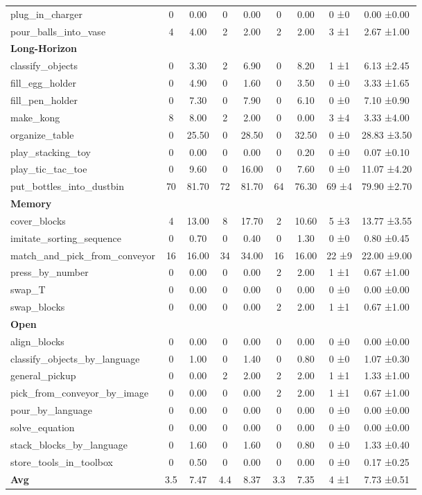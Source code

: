 \begin{table}[H]
{\begin{tabular}{l|c|c|c|c|c|c|c|c}
plug\_in\_charger & 0 & 0.00 & 0 & 0.00 & 0 & 0.00 & 0 ±0 & 0.00 ±0.00 \\
pour\_balls\_into\_vase & 4 & 4.00 & 2 & 2.00 & 2 & 2.00 & 3 ±1 & 2.67 ±1.00 \\
\hline
\multicolumn{9}{l}{\textbf{Long-Horizon}} \\
classify\_objects & 0 & 3.30 & 2 & 6.90 & 0 & 8.20 & 1 ±1 & 6.13 ±2.45 \\
fill\_egg\_holder & 0 & 4.90 & 0 & 1.60 & 0 & 3.50 & 0 ±0 & 3.33 ±1.65 \\
fill\_pen\_holder & 0 & 7.30 & 0 & 7.90 & 0 & 6.10 & 0 ±0 & 7.10 ±0.90 \\
make\_kong & 8 & 8.00 & 2 & 2.00 & 0 & 0.00 & 3 ±4 & 3.33 ±4.00 \\
organize\_table & 0 & 25.50 & 0 & 28.50 & 0 & 32.50 & 0 ±0 & 28.83 ±3.50 \\
play\_stacking\_toy & 0 & 0.00 & 0 & 0.00 & 0 & 0.20 & 0 ±0 & 0.07 ±0.10 \\
play\_tic\_tac\_toe & 0 & 9.60 & 0 & 16.00 & 0 & 7.60 & 0 ±0 & 11.07 ±4.20 \\
put\_bottles\_into\_dustbin & 70 & 81.70 & 72 & 81.70 & 64 & 76.30 & 69 ±4 & 79.90 ±2.70 \\
\hline
\multicolumn{9}{l}{\textbf{Memory}} \\
cover\_blocks & 4 & 13.00 & 8 & 17.70 & 2 & 10.60 & 5 ±3 & 13.77 ±3.55 \\
imitate\_sorting\_sequence & 0 & 0.70 & 0 & 0.40 & 0 & 1.30 & 0 ±0 & 0.80 ±0.45 \\
match\_and\_pick\_from\_conveyor & 16 & 16.00 & 34 & 34.00 & 16 & 16.00 & 22 ±9 & 22.00 ±9.00 \\
press\_by\_number & 0 & 0.00 & 0 & 0.00 & 2 & 2.00 & 1 ±1 & 0.67 ±1.00 \\
swap\_T & 0 & 0.00 & 0 & 0.00 & 0 & 0.00 & 0 ±0 & 0.00 ±0.00 \\
swap\_blocks & 0 & 0.00 & 0 & 0.00 & 2 & 2.00 & 1 ±1 & 0.67 ±1.00 \\
\hline
\multicolumn{9}{l}{\textbf{Open}} \\
align\_blocks & 0 & 0.00 & 0 & 0.00 & 0 & 0.00 & 0 ±0 & 0.00 ±0.00 \\
classify\_objects\_by\_language & 0 & 1.00 & 0 & 1.40 & 0 & 0.80 & 0 ±0 & 1.07 ±0.30 \\
general\_pickup & 0 & 0.00 & 2 & 2.00 & 2 & 2.00 & 1 ±1 & 1.33 ±1.00 \\
pick\_from\_conveyor\_by\_image & 0 & 0.00 & 0 & 0.00 & 2 & 2.00 & 1 ±1 & 0.67 ±1.00 \\
pour\_by\_language & 0 & 0.00 & 0 & 0.00 & 0 & 0.00 & 0 ±0 & 0.00 ±0.00 \\
solve\_equation & 0 & 0.00 & 0 & 0.00 & 0 & 0.00 & 0 ±0 & 0.00 ±0.00 \\
stack\_blocks\_by\_language & 0 & 1.60 & 0 & 1.60 & 0 & 0.80 & 0 ±0 & 1.33 ±0.40 \\
store\_tools\_in\_toolbox & 0 & 0.50 & 0 & 0.00 & 0 & 0.00 & 0 ±0 & 0.17 ±0.25 \\
\hline
\textbf{Avg} & 3.5 & 7.47 & 4.4 & 8.37 & 3.3 & 7.35 & 4 ±1 & 7.73 ±0.51 \\
\hline
\end{tabular}
}
\end{table}
